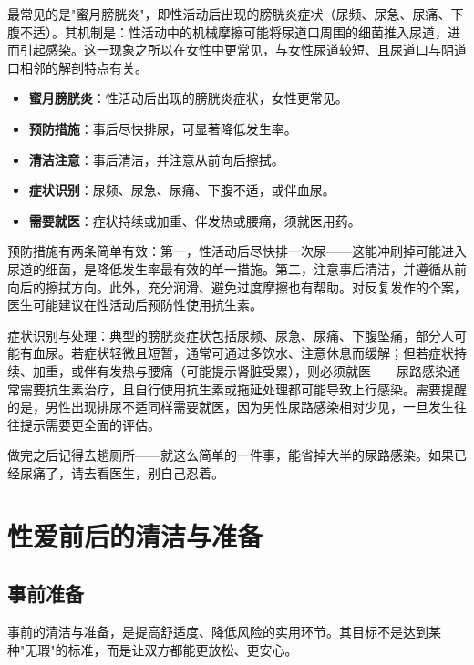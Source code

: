 \documentclass[12pt,UTF8]{ctexbook}
\newcommand{\keyword}[1]{\textbf{#1}}
\begin{document}
最常见的是"蜜月膀胱炎"，即性活动后出现的膀胱炎症状（尿频、尿急、尿痛、下腹不适）。其机制是：性活动中的机械摩擦可能将尿道口周围的细菌推入尿道，进而引起感染。这一现象之所以在女性中更常见，与女性尿道较短、且尿道口与阴道口相邻的解剖特点有关。

\begin{itemize}
  \item \keyword{蜜月膀胱炎}：性活动后出现的膀胱炎症状，女性更常见。
  \item \keyword{预防措施}：事后尽快排尿，可显著降低发生率。
  \item \keyword{清洁注意}：事后清洁，并注意从前向后擦拭。
  \item \keyword{症状识别}：尿频、尿急、尿痛、下腹不适，或伴血尿。
  \item \keyword{需要就医}：症状持续或加重、伴发热或腰痛，须就医用药。
\end{itemize}

预防措施有两条简单有效：第一，性活动后尽快排一次尿——这能冲刷掉可能进入尿道的细菌，是降低发生率最有效的单一措施。第二，注意事后清洁，并遵循从前向后的擦拭方向。此外，充分润滑、避免过度摩擦也有帮助。对反复发作的个案，医生可能建议在性活动后预防性使用抗生素。

症状识别与处理：典型的膀胱炎症状包括尿频、尿急、尿痛、下腹坠痛，部分人可能有血尿。若症状轻微且短暂，通常可通过多饮水、注意休息而缓解；但若症状持续、加重，或伴有发热与腰痛（可能提示肾脏受累），则必须就医——尿路感染通常需要抗生素治疗，且自行使用抗生素或拖延处理都可能导致上行感染。需要提醒的是，男性出现排尿不适同样需要就医，因为男性尿路感染相对少见，一旦发生往往提示需要更全面的评估。

\begin{tcolorbox}[colback=pink!5!white,colframe=red!50!black,title=贴心小叮咛]
做完之后记得去趟厕所——就这么简单的一件事，能省掉大半的尿路感染。如果已经尿痛了，请去看医生，别自己忍着。
\end{tcolorbox}

\section{性爱前后的清洁与准备}
\subsection{事前准备}

事前的清洁与准备，是提高舒适度、降低风险的实用环节。其目标不是达到某种"无瑕"的标准，而是让双方都能更放松、更安心。
\end{document}

